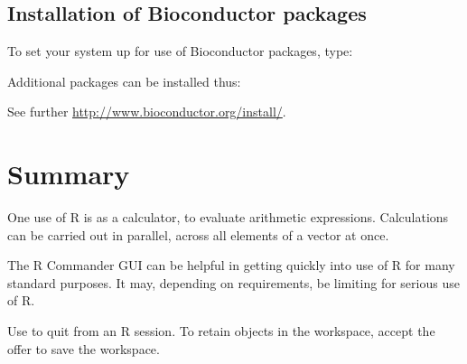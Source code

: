 \subsection*{Installation of Bioconductor packages}
  To set your system up for use of
Bioconductor packages, type:
\begin{knitrout}
\color{fgcolor}\begin{kframe}
\begin{alltt}
\hlstd{(}\hlstd{)}
\hlstd{()}
\end{alltt}
\end{kframe}
\end{knitrout}
Additional packages can be installed thus:
\begin{knitrout}
\color{fgcolor}\begin{kframe}
\begin{alltt}
\hlstd{(}\hlstd{(}\hlstd{,} \hlstd{))}
\end{alltt}
\end{kframe}
\end{knitrout}
See further \url{http://www.bioconductor.org/install/}.

\section{Summary}
\begin{itemizz}
\item[] One use of R is as a calculator, to evaluate arithmetic
expressions. Calculations can be carried out in parallel, across all
elements of a vector at once.

\item[] The R Commander GUI can be helpful in getting quickly into use
  of R for many standard purposes.  It may, depending on requirements,
  be limiting for serious use of R.

\item[] Use  to quit from an R session. To retain objects in
  the workspace, accept the offer to save the workspace.
\end{itemizz}

